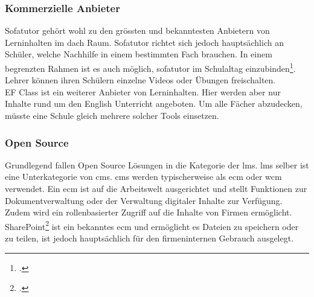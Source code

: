 \subsubsection{Kommerzielle Anbieter}
Sofatutor gehört wohl zu den grössten und bekanntesten Anbietern von Lerninhalten im \gls{dach} Raum. Sofatutor richtet sich jedoch hauptsächlich an Schüler, welche Nachhilfe in einem bestimmten Fach brauchen. In einem begrenzten Rahmen ist es auch möglich, sofatutor im Schulaltag einzubinden\footcite{sofatutor_fuer_lehrer}. Lehrer können ihren Schülern einzelne Videos oder Übungen freischalten. \\

EF Class ist ein weiterer Anbieter von Lerninhalten. Hier werden aber nur Inhalte rund um den English Unterricht angeboten. Um alle Fächer abzudecken, müsste eine Schule gleich mehrere solcher Tools einsetzen. \\


\subsubsection{Open Source}
Grundlegend fallen Open Source Lösungen in die Kategorie der \gls{lms}. \gls{lms} selber ist eine Unterkategorie von \gls{cms}. \gls{cms} werden typischerweise als \gls{ecm} oder \gls{wcm} verwendet. Ein \gls{ecm} ist auf die Arbeitswelt ausgerichtet und stellt Funktionen zur Dokumentverwaltung oder der Verwaltung digitaler Inhalte zur Verfügung. Zudem wird ein rollenbasierter Zugriff auf die Inhalte von Firmen ermöglicht. SharePoint\footcite{sharepoint} ist ein bekanntes \gls{ecm} und ermöglicht es Dateien zu speichern oder zu teilen, ist jedoch hauptsächlich für den firmeninternen Gebrauch ausgelegt. \\

